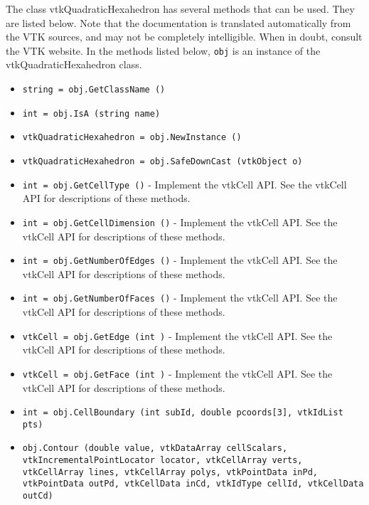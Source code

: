The class vtkQuadraticHexahedron has several methods that can be used.
  They are listed below.
Note that the documentation is translated automatically from the VTK sources,
and may not be completely intelligible.  When in doubt, consult the VTK website.
In the methods listed below, \verb|obj| is an instance of the vtkQuadraticHexahedron class.
\begin{itemize}
\item  \verb|string = obj.GetClassName ()|

\item  \verb|int = obj.IsA (string name)|

\item  \verb|vtkQuadraticHexahedron = obj.NewInstance ()|

\item  \verb|vtkQuadraticHexahedron = obj.SafeDownCast (vtkObject o)|

\item  \verb|int = obj.GetCellType ()| -  Implement the vtkCell API. See the vtkCell API for descriptions
 of these methods.

\item  \verb|int = obj.GetCellDimension ()| -  Implement the vtkCell API. See the vtkCell API for descriptions
 of these methods.

\item  \verb|int = obj.GetNumberOfEdges ()| -  Implement the vtkCell API. See the vtkCell API for descriptions
 of these methods.

\item  \verb|int = obj.GetNumberOfFaces ()| -  Implement the vtkCell API. See the vtkCell API for descriptions
 of these methods.

\item  \verb|vtkCell = obj.GetEdge (int )| -  Implement the vtkCell API. See the vtkCell API for descriptions
 of these methods.

\item  \verb|vtkCell = obj.GetFace (int )| -  Implement the vtkCell API. See the vtkCell API for descriptions
 of these methods.

\item  \verb|int = obj.CellBoundary (int subId, double pcoords[3], vtkIdList pts)|

\item  \verb|obj.Contour (double value, vtkDataArray cellScalars, vtkIncrementalPointLocator locator, vtkCellArray verts, vtkCellArray lines, vtkCellArray polys, vtkPointData inPd, vtkPointData outPd, vtkCellData inCd, vtkIdType cellId, vtkCellData outCd)|


\end{itemize}
